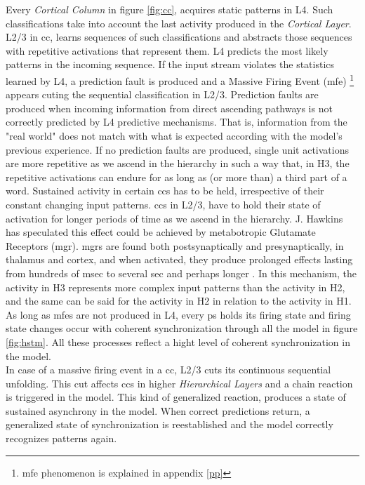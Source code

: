 \documentclass[11pt,a4paper]{article}
\begin{document}
Every \textit{Cortical Column} in figure \ref{fig:cc}, acquires static patterns
in L4.
Such classifications take into account the last activity produced in the
\textit{Cortical Layer}.
L2/3 in \ac{cc}, learns sequences of such classifications and abstracts those
sequences with repetitive activations that represent them.
L4 predicts the most likely patterns in the incoming sequence.
If the input stream violates the statistics learned by L4,
a prediction fault is produced and a Massive Firing Event (\ac{mfe})
\footnote{\ac{mfe} phenomenon is explained in appendix \ref{pp}}
appears cuting the sequential classification in L2/3.
Prediction faults are produced when incoming information from direct ascending pathways
is not correctly predicted by L4 predictive mechanisms.
That is, information from the "real world" does not match with what is expected
according with the model's previous experience.
If no prediction faults are produced, single unit activations
are more repetitive as we ascend in the hierarchy in such
a way that, in H3, the repetitive activations can endure
for as long as (or more than) a third part of a word.
Sustained activity in certain \ac{cc}s has to be held, irrespective of
their constant changing input patterns.
\ac{cc}s in L2/3, have to hold their state of activation for longer
periods of time as we ascend in the hierarchy.
J. Hawkins has speculated this effect could be achieved by metabotropic
Glutamate Receptors (\ac{mgr}).
\ac{mgr}s are found both postsynaptically and presynaptically,
in thalamus and cortex,
and when activated, they produce prolonged effects lasting
from hundreds of msec to several sec and perhaps longer \cite{sherman14}.
In this mechanism, the activity in H3 represents more complex input patterns
than the activity in H2, and the same can be said for the activity in H2
in relation to the activity in H1.
As long as \ac{mfe}s are not produced in L4, every \ac{ps} holds its firing state
and firing state changes occur with coherent synchronization through all the
model in figure \ref{fig:hstm}.
All these processes reflect a hight level of coherent synchronization in the model.\\

In case of a massive firing event in a \ac{cc}, L2/3 cuts its continuous sequential unfolding.
This cut affects \ac{cc}s in higher \textit{Hierarchical Layers} and a chain reaction
is triggered in the model.
This kind of generalized reaction, produces a state of sustained asynchrony in the model.
When correct predictions return, a generalized state of synchronization is
reestablished and the model correctly recognizes patterns again.\\
\end{document}
